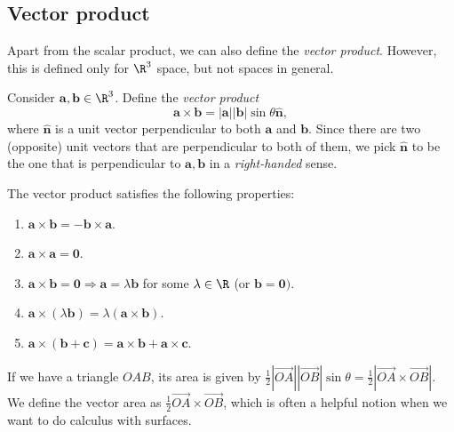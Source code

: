 \documentclass[a4paper]{article}
\begin{document}
\subsection{Vector product}
Apart from the scalar product, we can also define the \emph{vector product}. However, this is defined only for $\R^3$ space, but not spaces in general.
\begin{defi}
  Consider $\mathbf{a, b}\in \R^3$. Define the \emph{vector product}
  \[
    \mathbf{a\times b} = \mathbf{|a||b|}\sin\theta \hat{\mathbf{n}},
  \]
  where $\mathbf{\hat{n}}$ is a unit vector perpendicular to both $\mathbf{a}$ and $\mathbf{b}$. Since there are two (opposite) unit vectors that are perpendicular to both of them, we pick $\mathbf{\hat{n}}$ to be the one that is perpendicular to $\mathbf{a}, \mathbf{b}$ in a \emph{right-handed} sense.
  \begin{center}
  \end{center}
  The vector product satisfies the following properties:
  \begin{enumerate}
    \item $\mathbf{a\times b = -b\times a}$.
    \item $\mathbf{a\times a = 0}$.
    \item $\mathbf{a\times b = 0}\Rightarrow \mathbf{a} = \lambda\mathbf{b}$ for some $\lambda\in \R$ (or $\mathbf{b} = \mathbf{0})$.
    \item $\mathbf{a}\times (\lambda \mathbf{b}) = \lambda(\mathbf{a\times b})$.
    \item $\mathbf{a\times (b + c) = a\times b + a\times c}$.
  \end{enumerate}
\end{defi}

If we have a triangle $OAB$, its area is given by $\frac{1}{2}|\overrightarrow{OA}||\overrightarrow{OB}|\sin\theta = \frac{1}{2}|\overrightarrow{OA}\times\overrightarrow{OB}|$. We define the vector area as $\frac{1}{2}\overrightarrow{OA}\times\overrightarrow{OB}$, which is often a helpful notion when we want to do calculus with surfaces.
\end{document}

